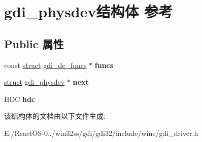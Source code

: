\hypertarget{structgdi__physdev}{}\section{gdi\+\_\+physdev结构体 参考}
\label{structgdi__physdev}
\subsection*{Public 属性}
\begin{DoxyCompactItemize}
\item 
\mbox{\label{structgdi__physdev_a2acfbea13581aa0b8ce7fbd3b4cdc698}} 
const \hyperlink{interfacestruct}{struct} \hyperlink{structgdi__dc__funcs}{gdi\+\_\+dc\+\_\+funcs} $\ast$ {\bfseries funcs}
\item 
\mbox{\label{structgdi__physdev_a6e4a7fcf146accc298b40af88f4c29f7}} 
\hyperlink{interfacestruct}{struct} \hyperlink{structgdi__physdev}{gdi\+\_\+physdev} $\ast$ {\bfseries next}
\item 
\mbox{\label{structgdi__physdev_a05f39654a1a995cd371155bfacd116ed}} 
H\+DC {\bfseries hdc}
\end{DoxyCompactItemize}


该结构体的文档由以下文件生成\+:\begin{DoxyCompactItemize}
\item 
E\+:/\+React\+O\+S-\/0../win32ss/gdi/gdi32/include/wine/gdi\+\_\+driver.\+h\end{DoxyCompactItemize}
